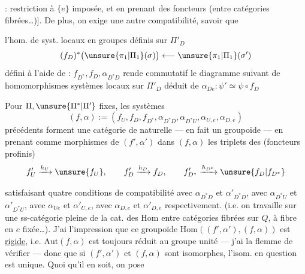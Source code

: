 : restriction à $\{e\}$ imposée, et en prenant des foncteurs
 (entre catégories fibrées\ldots)].
De plus, on exige une autre compatibilité, savoir que

 l'hom. de syst. locaux en groupes définis sur $\Pi'_D$
\[
(f_D)^*\bigl(\unsure{\pi_1|\Pi_1}(\sigma)\bigr)
\longleftarrow \unsure{\pi_1|\Pi_1}(\sigma')
\]
défini à l'aide de : $f_{D^*},f_D,\alpha_{D^*D}$
rende commutatif le diagramme suivant de
 homomorphismes 
 systèmes locaux sur $\Pi'_D$
déduit de $\alpha_{De}:\psi'\simeq\psi\circ f_D$


Pour $\Pi,\unsure{\Pi^*|\Pi'}$ fixes, les systèmes
\[
(f,\alpha):=(f_U,f_D,f_{D^*},\alpha_{D^*D},\alpha_{D^*U},
\alpha_{U,e},\alpha_{D,e})
\]
précédents forment une catégorie de  naturelle
--- en fait un groupoïde --- en prenant comme morphismes
 de $(f',\alpha')$ dans $(f,\alpha)$
les triplets des 
(foncteurs profinis)
\[
f'_U\xrightarrow{h_U}\unsure{f_U},\qquad
f'_D\xrightarrow{h_D}f_D,\qquad
f'_{D^*}\xrightarrow{h_{D^*}}\unsure{f_D|f_{D^*}}
\]

satisfaisant  quatre conditions de compatibilité avec
$\alpha_{D^*D}$ et $\alpha'_{D^*D}$, avec $\alpha_{D^*U}$ et
$\alpha'_{D^*U}$, avec $\alpha_{Ue}$ et $\alpha'_{U,e}$, avec
$\alpha_{D,e}$ et $\alpha'_{D,e}$ respectivement.
(i.e. on travaille sur une ss-catégorie pleine de la
 cat. des \uline{$\mathrm{Hom}$} entre catégories
fibrées sur $Q$, à fibre en $e$ fixée\ldots).
J'ai l'impression que ce groupoïde
\uline{$\mathrm{Hom}$}$((f',\alpha'),(f,\alpha))$ est
 \uline{rigide}, i.e.
$\mathrm{Aut}(f,\alpha)$ est toujours réduit au groupe unité
--- j'ai la flemme de vérifier --- donc que si $(f',\alpha')$ et
$(f,\alpha)$ sont isomorphes, l'isom. en question est unique.
Quoi qu'il en soit, on pose

